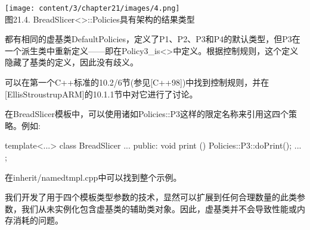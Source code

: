 \begin{center}
\texttt{[image: content/3/chapter21/images/4.png]} \\
图21.4. BreadSlicer<>::Policies具有架构的结果类型
\end{center}

都有相同的虚基类DefaultPolicies，定义了P1、P2、P3和P4的默认类型，但P3在一个派生类中重新定义——即在Policy3\_is<>中定义。根据控制规则，这个定义隐藏了基类的定义，因此没有歧义。

\begin{notice}可以在第一个C++标准的10.2/6节(参见[C++98])中找到控制规则，并在[EllisStroustrupARM]的10.1.1节中对它进行了讨论。
\end{notice}

在BreadSlicer模板中，可以使用诸如Policies::P3这样的限定名称来引用这四个策略。例如:

\begin{cpp}
template<...>
class BreadSlicer {
	...
	public:
	void print () {
		Policies::P3::doPrint();
	}
	...
};
\end{cpp}

在inherit/namedtmpl.cpp中可以找到整个示例。

我们开发了用于四个模板类型参数的技术，显然可以扩展到任何合理数量的此类参数，我们从未实例化包含虚基类的辅助类对象。因此，虚基类并不会导致性能或内存消耗的问题。






